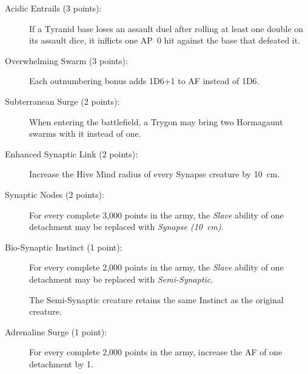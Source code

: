 \begin{description}
    \item[Acidic Entrails (3 points):]
    If a Tyranid base loses an assault duel after rolling at least one double on its assault dice, it inflicts one AP~0 hit against the base that defeated it.

    \item[Overwhelming Swarm (3 points):]
    Each outnumbering bonus adds 1D6+1 to AF instead of 1D6.

    \item[Subterranean Surge (2 points):]
    When entering the battlefield, a Trygon may bring two Hormagaunt swarms with it instead of one.

    \item[Enhanced Synaptic Link (2 points):]
    Increase the Hive Mind radius of every Synapse creature by 10~cm.

    \item[Synaptic Nodes (2 points):]
    For every complete 3,000 points in the army, the \textit{Slave} ability of one detachment may be replaced with \textit{Synapse (10~cm)}.

    \item[Bio-Synaptic Instinct (1 point):]
    For every complete 2,000 points in the army, the \textit{Slave} ability of one detachment may be replaced with \textit{Semi-Synaptic}.

    The Semi-Synaptic creature retains the same Instinct as the original creature.

    \item[Adrenaline Surge (1 point):]
    For every complete 2,000 points in the army, increase the AF of one detachment by 1.
\end{description}